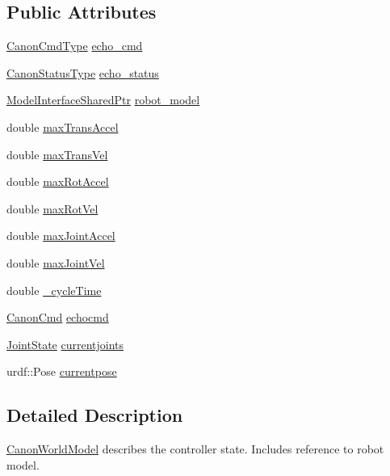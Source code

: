 \subsection*{Public Attributes}
\begin{DoxyCompactItemize}
\item 
\hyperlink{namespaceRCS_a55bbd74afb87a330de1b95af65f4cb75}{Canon\-Cmd\-Type} \hyperlink{structRCS_1_1CanonWorldModel_aed51034c2dd7b1a78722fe7444691132}{echo\-\_\-cmd}
\item 
\hyperlink{namespaceRCS_a0e720341c250145b8a2bbf6a1afa777d}{Canon\-Status\-Type} \hyperlink{structRCS_1_1CanonWorldModel_a59f849abf2987e1745aaf6db68eecb07}{echo\-\_\-status}
\item 
\hyperlink{RCS_8h_a20fcacb5362f459b2122712e88613342}{Model\-Interface\-Shared\-Ptr} \hyperlink{structRCS_1_1CanonWorldModel_a185c2b5e3eaba715be4d49b47879574c}{robot\-\_\-model}
\item 
double \hyperlink{structRCS_1_1CanonWorldModel_a9b6d5469341e73289788ba0fe0f3c57a}{max\-Trans\-Accel}
\item 
double \hyperlink{structRCS_1_1CanonWorldModel_a55824e72d1d92c8b5f5c8ecf3b7c7a00}{max\-Trans\-Vel}
\item 
double \hyperlink{structRCS_1_1CanonWorldModel_aca5f8ebce128e94ed4edf3caabb6c363}{max\-Rot\-Accel}
\item 
double \hyperlink{structRCS_1_1CanonWorldModel_acbb472eee22bb4764dc865476fe56950}{max\-Rot\-Vel}
\item 
double \hyperlink{structRCS_1_1CanonWorldModel_ac20eae577122dd6dc58f92f33c1de53c}{max\-Joint\-Accel}
\item 
double \hyperlink{structRCS_1_1CanonWorldModel_a29c9099062e430196fc659fd7ae2f8ef}{max\-Joint\-Vel}
\item 
double \hyperlink{structRCS_1_1CanonWorldModel_a8b14e4665c3491b8a68977dbf84c9479}{\-\_\-cycle\-Time}
\item 
\hyperlink{structRCS_1_1CanonCmd}{Canon\-Cmd} \hyperlink{structRCS_1_1CanonWorldModel_ac7e75df0508ec626b834a77ebfe0465f}{echocmd}
\item 
\hyperlink{RCS_8h_aa4adb93a26caa4dacba9c9614e283245}{Joint\-State} \hyperlink{structRCS_1_1CanonWorldModel_a0060a81cde9ecf9ae02c5e61b8345a5b}{currentjoints}
\item 
urdf\-::\-Pose \hyperlink{structRCS_1_1CanonWorldModel_a1697a067100635db9d99f1bb92c50764}{currentpose}
\end{DoxyCompactItemize}


\subsection{Detailed Description}
\hyperlink{structRCS_1_1CanonWorldModel}{Canon\-World\-Model} describes the controller state. Includes reference to robot model. 

